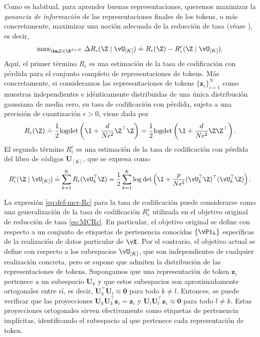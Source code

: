 \documentclass[../../book-main.tex]{subfiles}
\begin{document}
Como es habitual, para aprender buenas representaciones, queremos maximizar
la \textit{ganancia de información} de las representaciones finales de los tokens, o
más concretamente, maximizar una noción adecuada de la reducción de tasa
(véase ), es decir,
\begin{align}\label{eq:rate reduction}
    \mathrm{max}_{\bm Z \in \R^{d\times N}}\ \Delta R_{\epsilon}(\Z
    \mid \vU_{[K]}) \doteq R_{\epsilon}(\Z) - R^c_{\epsilon}(\Z \mid \vU_{[K]}).
\end{align}
Aquí, el primer término $R_{\epsilon}$ es una estimación de la tasa de codificación con pérdida
para el conjunto completo de representaciones de tokens. Más
concretamente, si consideramos las representaciones de tokens $\{\bm
z_i\}_{i=1}^N$ como muestras independientes e idénticamente distribuidas de una única distribución gaussiana de media cero,
su tasa de codificación con pérdida, sujeta a una precisión de cuantización $\epsilon
> 0$, viene dada por
\begin{equation}\label{eq:coding_rate}
    R_{\epsilon}(\Z) \doteq \frac{1}{2}\textrm{logdet}\left(\I +
    \frac{d}{N\epsilon^{2}}\Z^{\top}\Z\right) =
    \frac{1}{2}\textrm{logdet}\left(\I +
    \frac{d}{N\epsilon^{2}}\Z\Z^{\top}\right).
\end{equation}
El segundo término $R_{\epsilon}^c$ es una estimación de la tasa de codificación con pérdida
del libro de códigos $\bm U_{[K]}$, que se expresa como
\begin{equation}
    \scalebox{0.95}{\(\displaystyle R_{\epsilon}^c(\Z \mid \vU_{[K]}) \doteq
            \sum_{k=1}^{K}R_{\epsilon}(\vU_k^{\top} \Z) =
            \frac{1}{2}\sum_{k=1}^{K}\log\det\left(\I +
    \frac{p}{N\epsilon^{2}}(\vU_k^{\top}\Z)^{\top}(\vU_k^{\top}\Z)\right).\)}
    \label{eq:def-mcr-Rc}
\end{equation}

\begin{remark}
    La expresión \eqref{eq:def-mcr-Rc} para la tasa de codificación puede
    considerarse como una generalización de la tasa de codificación \(R_\epsilon^{c}\)
    utilizada en el objetivo original de reducción de tasa \eqref{eq:MCRc}. En
    particular, el objetivo original se define con respecto a un
    conjunto de etiquetas de pertenencia conocidas \(\{\vPi_{k}\}\) específicas de la
    realización de datos particular de \(\vX\). Por el contrario, el objetivo actual
    se define con respecto a los subespacios \(\vU_{[K]}\),
    que son independientes de cualquier realización concreta, pero 
    se supone que admiten la distribución de las representaciones de tokens.
    Supongamos que una representación de token $\bm z_i$ pertenece a un
    subespacio $\bm U_k$ y que estos subespacios son aproximadamente
    ortogonales entre sí, es decir, $\bm U_k^\top \bm U_l \approx \bm
    0$ para todo $k \neq l$. Entonces, se puede verificar que las proyecciones
    $\bm U_k\bm U_k^\top \bm z_i  = \bm z_i$ y  $\bm U_l\bm
    U_l^\top \bm z_i \approx \bm 0$ para todo $l \neq k$. Estas
    proyecciones ortogonales sirven efectivamente como etiquetas de pertenencia implícitas,
    identificando el subespacio al que pertenece cada representación de token.
\end{remark}
\end{document}
